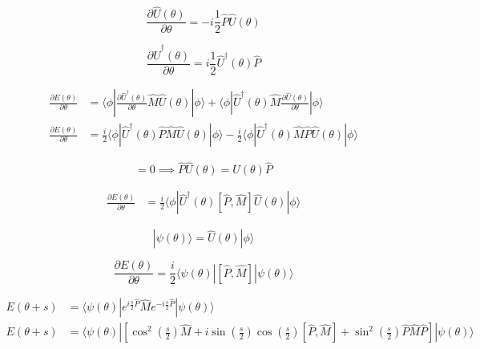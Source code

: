 \begin{equation}
    \frac{\partial \hat{U}(\theta)}{\partial \theta} = -i \frac{1}{2} \hat{P} \hat{U}(\theta)
\end{equation}

\begin{equation}
    \frac{\partial \hat{U}^{\dagger}(\theta)}{\partial \theta} = i \frac{1}{2} \hat{U}^{\dagger}(\theta) \hat{P}
\end{equation}

\begin{align}
    \frac{\partial E(\theta)}{\partial \theta} &= \langle \phi | \frac{\partial \hat{U}^{\dagger}(\theta)}{\partial \theta} \hat{M} \hat{U}(\theta) | \phi \rangle + \langle \phi | \hat{U}^{\dagger}(\theta) \hat{M} \frac{\partial \hat{U}(\theta)}{\partial \theta} | \phi \rangle \\
    \frac{\partial E(\theta)}{\partial \theta} &= \frac{i}{2} \langle \phi | \hat{U}^{\dagger}(\theta) \hat{P} \hat{M} \hat{U}(\theta) | \phi \rangle - \frac{i}{2} \langle \phi | \hat{U}^{\dagger}(\theta) \hat{M} \hat{P} \hat{U}(\theta) | \phi \rangle
\end{align}

\begin{equation}
    [\hat{P}, \hat{U}(\theta)] = 0 \implies \hat{P} \hat{U}(\theta) = \hat{U}(\theta) \hat{P}
\end{equation}

\begin{align}
    \frac{\partial E(\theta)}{\partial \theta} &= \frac{i}{2} \langle \phi | \hat{U}^{\dagger}(\theta) [\hat{P}, \hat{M}] \hat{U}(\theta) | \phi \rangle
\end{align}

\begin{equation}
    | \psi(\theta) \rangle = \hat{U}(\theta) | \phi \rangle
\end{equation}

\begin{equation}
    \frac{\partial E(\theta)}{\partial \theta} = \frac{i}{2} \langle \psi(\theta) | [\hat{P}, \hat{M}] | \psi(\theta) \rangle
\end{equation}

\begin{align}
    E(\theta + s) &= \langle \psi(\theta) | e^{i \frac{s}{2} \hat{P}} \hat{M} e^{-i \frac{s}{2} \hat{P}} | \psi(\theta) \rangle \\
    E(\theta + s) &= \langle \psi(\theta) | \left[ \cos^2\left(\frac{s}{2}\right) \hat{M} + i \sin\left(\frac{s}{2}\right)\cos\left(\frac{s}{2}\right) [\hat{P}, \hat{M}] + \sin^2\left(\frac{s}{2}\right) \hat{P} \hat{M} \hat{P} \right] | \psi(\theta) \rangle
\end{align}

